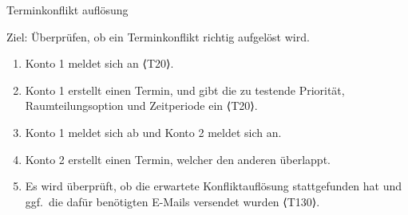 \begin{scenario}{50}{Terminkonflikt auflösung}
  \item[Ziel:] Überprüfen, ob ein Terminkonflikt richtig aufgelöst wird.
  \begin{enumerate}
    \item Konto 1 meldet sich an ⟨T20⟩.
    \item Konto 1 erstellt einen Termin, und gibt die zu testende Priorität, Raumteilungsoption und Zeitperiode ein ⟨T20⟩.
    \item Konto 1 meldet sich ab und Konto 2 meldet sich an.
    \item Konto 2 erstellt einen Termin, welcher den anderen überlappt.
    \item Es wird überprüft, ob die erwartete Konfliktauflösung stattgefunden hat und ggf.\ die dafür benötigten E-Mails versendet wurden ⟨T130⟩.
  \end{enumerate}
\end{scenario}
